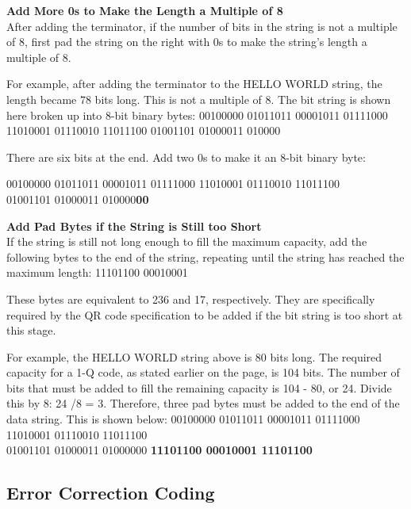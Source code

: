 \textbf{Add More 0s to Make the Length a Multiple of 8}\\
After adding the terminator, if the number of bits in the string is not a multiple of 8, first pad the string on the right with 0s to make the string's length a multiple of 8.

For example, after adding the terminator to the HELLO WORLD string, the length became 78 bits long. This is not a multiple of 8. The bit string is shown here broken up into 8-bit binary bytes:
00100000 01011011 00001011 01111000 11010001 01110010 11011100 01001101 01000011 010000

There are six bits at the end. Add two 0s to make it an 8-bit binary byte:

00100000 01011011 00001011 01111000 11010001 01110010 11011100\\ 01001101 01000011 010000\textbf{00}

\textbf{Add Pad Bytes if the String is Still too Short}\\
If the string is still not long enough to fill the maximum capacity, add the following bytes to the end of the string, repeating until the string has reached the maximum length:
11101100 00010001

These bytes are equivalent to 236 and 17, respectively. They are specifically required by the QR code specification to be added if the bit string is too short at this stage.

For example, the HELLO WORLD string above is 80 bits long. The required capacity for a 1-Q code, as stated earlier on the page, is 104 bits. The number of bits that must be added to fill the remaining capacity is 104 - 80, or 24. Divide this by 8: 24 /8 = 3. Therefore, three pad bytes must be added to the end of the data string. This is shown below:
00100000 01011011 00001011 01111000 11010001 01110010 11011100\\ 01001101 01000011 01000000 \textbf{11101100 00010001 11101100}

\subsection{Error Correction Coding}

